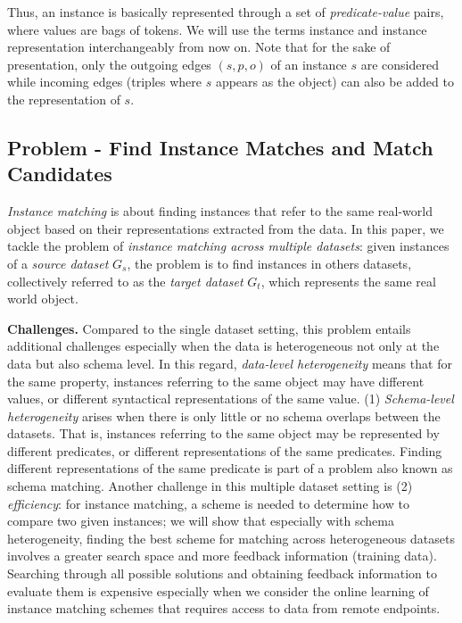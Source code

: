 Thus, an instance is basically represented through a set of \emph{predicate-value} pairs, where values are bags of tokens.  
We will use the terms instance and instance representation interchangeably from now on. Note that for the sake of presentation, only the outgoing edges $(s, p, o)$ of an instance $s$ are considered while incoming edges (triples where $s$ appears as the object) can also be added to the representation of $s$. 

\subsection{Problem - Find Instance Matches and Match Candidates} \emph{Instance matching} is about finding instances that refer to the same real-world object based on their representations extracted from the data. In this paper, we tackle the problem of \emph{instance matching across multiple datasets}: given instances of a \emph{source dataset} $G_s$, the problem is to find instances in others datasets, collectively referred to as the \emph{target dataset} $G_t$, which represents the same real world object. 

\textbf{Challenges.} Compared to the single dataset setting, this problem entails additional challenges especially when the data is heterogeneous not only at the data but also schema level. In this regard, \emph{data-level heterogeneity} means that for the same property, instances referring to the same object may have different values, or different syntactical representations of the same value.  (1) \emph{Schema-level heterogeneity} arises when there is only little or no schema overlaps between the datasets. That is, instances referring to the same object may be represented by different predicates, or different representations of the same predicates. Finding different representations of the same predicate is part of a problem also known as schema matching. Another challenge in this multiple dataset setting is (2) \emph{efficiency}: for instance matching, a scheme is needed to determine how to compare two given instances; we will show that especially with schema heterogeneity, finding the best scheme for matching across heterogeneous datasets involves a greater search space and more feedback information (training data). Searching through all possible solutions and obtaining feedback information to evaluate them is expensive especially when we consider the online learning of instance matching schemes that requires access to data from remote endpoints. 

